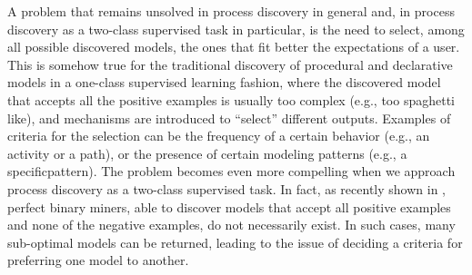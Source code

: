 A problem that remains unsolved in process discovery in general and, in process discovery as a two-class supervised task in particular, is the need to select, among all possible discovered models, the ones that fit better the expectations of a user. This is somehow true for the traditional discovery of procedural and declarative models in a one-class supervised learning fashion, where the discovered model that accepts all the positive examples is usually too complex (e.g., too spaghetti like), and mechanisms are introduced to ``select'' different outputs. Examples of criteria for the selection can be the frequency of a certain behavior (e.g., an activity or a path), or the presence of certain modeling patterns (e.g., a specific\declare pattern).   
The problem becomes even more compelling when we approach process discovery as a two-class supervised task. In fact, as recently shown in \cite{DBLP:conf/bpm/SlaatsDB21}, perfect binary miners, able to discover models that accept all positive examples and none of the negative examples, do not necessarily exist. In such cases, many sub-optimal models can be returned, leading to the issue of deciding a criteria for preferring one model to another.
 
